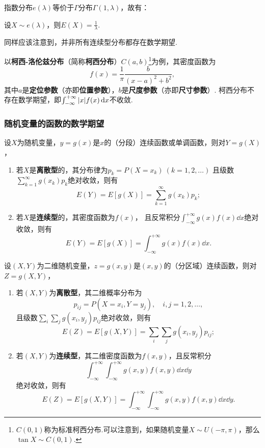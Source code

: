 指数分布\(e(\lambda)\)等价于\(\Gamma\)分布\(\Gamma(1,\lambda)\)，故有：
\begin{theorem}\label{theorem:随机变量的数字特征.指数分布的数学期望}
设\(X \sim e(\lambda)\)，则\(E(X) = \frac{1}{\lambda}\).
\end{theorem}

同样应该注意到，并非所有连续型分布都存在数学期望.

以\textbf{柯西-洛伦兹分布}（简称\textbf{柯西分布}）\(C(a,b)\)\footnote{\(C(0,1)\)称为标准柯西分布.可以注意到，如果随机变量\(X \sim U(-\pi,\pi)\)，那么\(\tan X \sim C(0,1)\).}为例，其密度函数为\[
f(x) = \frac{1}{\pi} \frac{b}{(x-a)^2+b^2},
\]其中\(a\)是\textbf{定位参数}（亦即\textbf{位置参数}），\(b\)是\textbf{尺度参数}（亦即\textbf{尺寸参数}）.
柯西分布不存在数学期望，即\(\int_{-\infty}^{+\infty} \abs{x} f(x) \dd{x}\)不收敛.

\subsubsection{随机变量的函数的数学期望}
\begin{theorem}\label{theorem:随机变量的数字特征.一维随机变量的函数的数学期望}
设\(X\)为随机变量，\(y=g(x)\)是\(x\)的（分段）连续函数或单调函数，则对\(Y=g(X)\)，%
\begin{enumerate}
\item 若\(X\)是\textbf{离散型}的，其分布律为\(p_k = P(X=x_k)\ (k=1,2,\dotsc)\)
且级数\(\sum\limits_{k=1}^{\infty} g(x_k) p_k\)绝对收敛，则有\[
E(Y) = E[g(X)] = \sum\limits_{k=1}^{\infty}{g(x_k) p_k};
\]
\item 若\(X\)是\textbf{连续型}的，其密度函数为\(f(x)\)，%
且反常积分\(\int_{-\infty}^{+\infty} g(x) f(x) \dd{x}\)绝对收敛，则有\[
E(Y) = E[g(X)] = \int_{-\infty}^{+\infty} g(x) f(x) \dd{x}.
\]
\end{enumerate}
\end{theorem}

\begin{theorem}\label{theorem:随机变量的数字特征.二维随机变量的函数的数学期望}
设\((X,Y)\)为二维随机变量，\(z=g(x,y)\)是\((x,y)\)的（分区域）连续函数，则对\(Z=g(X,Y)\)，\begin{enumerate}
\item 若\((X,Y)\)为\textbf{离散型}，其二维概率分布为\[
p_{ij} = P(X=x_i,Y=y_j), \quad i,j=1,2,\dotsc,
\]且级数\(\sum\limits_i \sum\limits_j g(x_i,y_j) p_{ij}\)绝对收敛，则有\[
E(Z) = E[g(X,Y)] = \sum\limits_i \sum\limits_j g(x_i,y_j) p_{ij};
\]
\item 若\((X,Y)\)为\textbf{连续型}，其二维密度函数为\(f(x,y)\)，且反常积分\[
\int_{-\infty}^{+\infty} \int_{-\infty}^{+\infty} g(x,y) f(x,y) \dd{x}\dd{y}
\]绝对收敛，则有\[
E(Z) = E[g(X,Y)] = \int_{-\infty}^{+\infty} \int_{-\infty}^{+\infty} g(x,y) f(x,y) \dd{x}\dd{y}.
\]
\end{enumerate}
\end{theorem}

